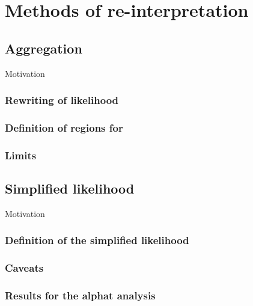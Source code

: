 \chapter{Methods of re-interpretation} %

\section{Aggregation}%
Motivation
\subsection{Rewriting of likelihood}
\subsection{Definition of regions for \alphat}
\subsection{Limits}
\section{Simplified likelihood}
Motivation
\subsection{Definition of the simplified likelihood}
\subsection{Caveats}
\subsection{Results for the alphat analysis}

